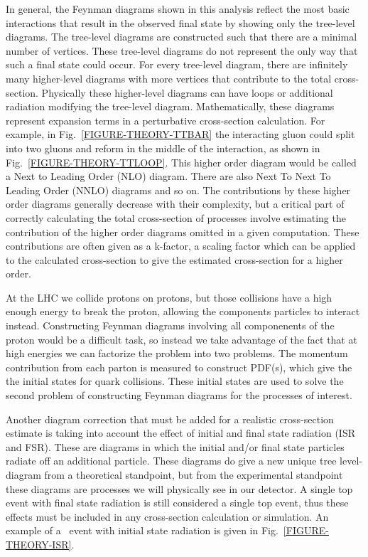 In general, the Feynman diagrams shown in this analysis reflect the most basic interactions that result in the observed final state by showing only the tree-level diagrams. The tree-level diagrams are constructed such that there are a minimal number of vertices. These tree-level diagrams do not represent the only way that such a final state could occur. For every tree-level diagram, there are infinitely many higher-level diagrams with more vertices that contribute to the total cross-section. Physically these higher-level diagrams can have loops or additional radiation modifying the tree-level diagram. Mathematically, these diagrams represent expansion terms in a perturbative cross-section calculation. For example, in Fig.~\ref{FIGURE-THEORY-TTBAR} the interacting gluon could split into two gluons and reform in the middle of the interaction, as shown in Fig.~\ref{FIGURE-THEORY-TTLOOP}. This higher order diagram would be called a Next to Leading Order (NLO) diagram. There are also Next To Next To Leading Order (NNLO) diagrams and so on. The contributions by these higher order diagrams generally decrease with their complexity, but a critical part of correctly calculating the total cross-section of processes involve estimating the contribution of the higher order diagrams omitted in a given computation. These contributions are often given as a k-factor, a scaling factor which can be applied to the calculated cross-section to give the estimated cross-section for a higher order.

At the LHC we collide protons on protons, but those collisions have a high enough energy to break the proton, allowing the components particles to interact instead. Constructing Feynman diagrams involving all componenents of the proton would be a difficult task, so instead we take advantage of the fact that at high energies we can factorize the problem into two problems. The momentum contribution from each parton is measured to construct PDF(s), which give the the initial states for quark collisions. These initial states are used to solve the second problem of constructing Feynman diagrams for the processes of interest.


Another diagram correction that must be added for a realistic cross-section estimate is taking into account the effect of initial and final state radiation (ISR and FSR). These are diagrams in which the initial and/or final state particles radiate off an additional particle. These diagrams do give a new unique tree level-diagram from a theoretical standpoint, but from the experimental standpoint these diagrams are processes we will physically see in our detector. A single top event with final state radiation is still considered a single top event, thus these effects must be included in any cross-section calculation or simulation. An example of a \TTbar\ event with initial state radiation is given in Fig.~\ref{FIGURE-THEORY-ISR}.

